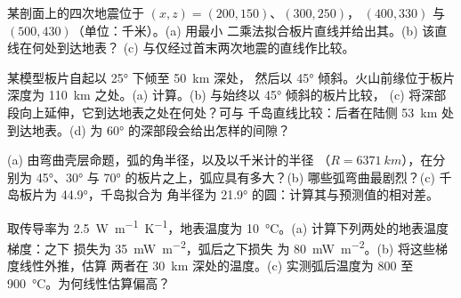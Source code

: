\begin{exercise}[$\star\star$]\label{exo:b1:active-margins:5}
某剖面上的四次地震位于 $(x, z) = (200, 150)$、$(300, 250)$，
$(400, 330)$ 与 $(500, 430)$（单位：千米）。(a) 用最小
二乘法拟合板片直线并给出其。(b) 该直线在何处到达地表？
(c) 与仅经过首末两次地震的直线作比较。
\end{exercise}

\begin{exercise}[$\star\star$]\label{exo:b1:active-margins:6}
某模型板片自起以 \ang{25} 下倾至 \qty{50}{km} 深处，
然后以 \ang{45} 倾斜。火山前缘位于板片深度为 \qty{110}{km} 之处。(a)
计算。(b) 与始终以 \ang{45} 倾斜的板片比较，
(c) 将深部段向上延伸，它到达地表之处在何处？可与
千岛直线比较：后者在陆侧 \qty{53}{km} 处到达地表。(d)
为 \ang{60} 的深部段会给出怎样的间隙？
\end{exercise}

\begin{exercise}[$\star\star$]\label{exo:b1:active-margins:7}
(a) 由弯曲壳层命题，弧的角半径，以及以千米计的半径
（$R = \qty{6371}{km}$），在分别为
\ang{45}、\ang{30} 与 \ang{70} 的板片之上，弧应具有多大？(b) 哪些弧弯曲最剧烈？(c)
千岛板片为 \ang{44.9}，千岛拟合为
角半径为 \ang{21.9} 的圆：计算其与预测值的相对差。
\end{exercise}

\begin{exercise}[$\star\star$]\label{exo:b1:active-margins:8}
取传导率为 \qty{2.5}{W.m^{-1}.K^{-1}}，地表温度为
\qty{10}{\celsius}。(a) 计算下列两处的地表温度梯度：之下
损失为 \qty{35}{mW.m^{-2}}，弧后之下损失
为 \qty{80}{mW.m^{-2}}。(b) 将这些梯度线性外推，估算
两者在 \qty{30}{km} 深处的温度。(c) 实测弧后温度为 800 至
\qty{900}{\celsius}。为何线性估算偏高？
\end{exercise}


